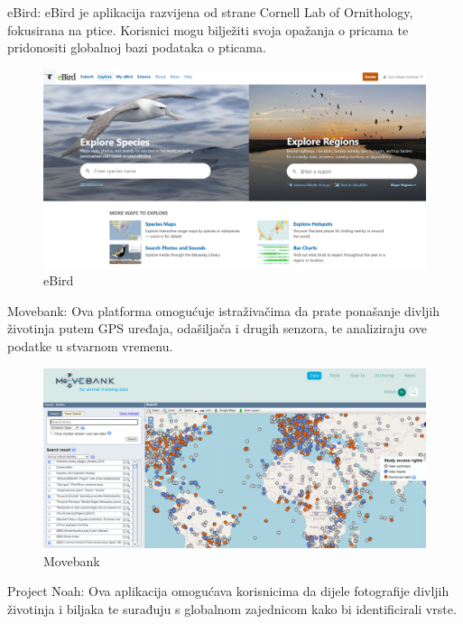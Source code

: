 \begin{packed_item}
			\item eBird: eBird je aplikacija razvijena od strane Cornell Lab of Ornithology, fokusirana na ptice. Korisnici mogu bilježiti svoja opažanja o pricama te pridonositi globalnoj bazi podataka o pticama.
			\begin{figure}[H]
				\includegraphics[width=\textwidth]{slike/ebird.PNG} %
				\caption{eBird}
				\label{fig:ebird} %
			\end{figure}
			\item Movebank: Ova platforma omogućuje istraživačima da prate ponašanje divljih životinja putem GPS uređaja, odašiljača i drugih senzora, te analiziraju ove podatke u stvarnom vremenu.
			\begin{figure}[H]
				\includegraphics[width=\textwidth]{slike/movebank.PNG} %
				\caption{Movebank}
				\label{fig:movebank} %
			\end{figure}
			\item Project Noah: Ova aplikacija omogućava korisnicima da dijele fotografije divljih životinja i biljaka te surađuju s globalnom zajednicom kako bi identificirali vrste.
			\begin{figure}[H]

\end{figure}
\end{packed_item}

